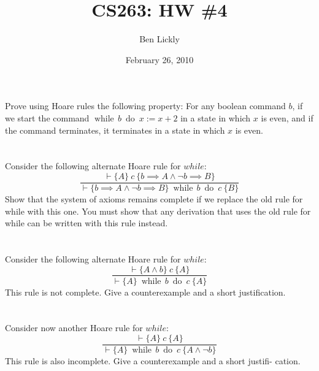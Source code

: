 \documentclass{article}
\title{CS263: HW \#4}
\author{Ben Lickly}
\date{February 26, 2010}
\newcommand{\problem}[1]
{\subsubsection*{} %
\vspace{-16pt} \section{} \vspace{-22pt} \qquad
#1%
\bigskip \bigskip
}
\newcommand{\while}[2]{\operatorname{while}\, #1\ \operatorname{do}\ #2}
\newcommand{\proves}{\vdash}
\newcommand{\axiomatic}[3]{\{#1\}\ #2\ \{#3\}}
\begin{document}
\maketitle

\problem{
Prove using Hoare rules the following property: For any boolean
command $b$, if we start the command $\while{b}{x := x + 2}$ in a state in
which $x$ is even, and if the command terminates, it terminates in a state in
which $x$ is even.
}

\problem{Consider the following alternate Hoare rule for $while$:
\[
\frac{\proves \axiomatic{A}{c}{b \implies A \wedge \neg b \implies B}}
{\proves \axiomatic{b \implies A \wedge \neg b \implies B}{\while{b}{c}}{B}}
\]
    Show that the system of axioms remains complete if we replace the old
rule for while with this one. You must show that any derivation that uses
the old rule for while can be written with this rule instead.
}

\problem{Consider the following alternate Hoare rule for $while$:
\[
\frac{\proves \axiomatic{A \wedge b}{c}{A}}
{\proves \axiomatic{A}{\while{b}{c}}{A}}
\]
This rule is not complete. Give a counterexample and a short justification.
}

\problem{Consider now another Hoare rule for $while$:
\[
\frac{\proves \axiomatic{A}{c}{A}}
{\proves \axiomatic{A}{\while{b}{c}}{A \wedge \neg b}}
\]
This rule is also incomplete. Give a counterexample and a short justifi-
cation.
}
\end{document}
